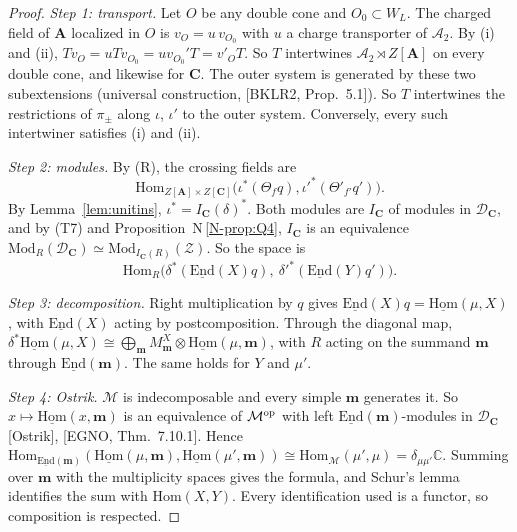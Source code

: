 \documentclass[11pt]{article}
\theoremstyle{definition}
\theoremstyle{remark}
\newcommand{\cA}{\mathcal A}
\newcommand{\bfA}{\mathbf A}
\newcommand{\bfC}{\mathbf C}
\newcommand{\nref}[1]{N\,\ref{N-#1}}
\begin{document}
\begin{proof}
\emph{Step 1: transport.} Let $O$ be any double cone and $O_0\subset W_L$. The charged field of $\bfA$ localized in $O$ is $v_O=u\,v_{O_0}$ with $u$ a charge transporter of $\cA_2$. By (i) and (ii), $Tv_O=uTv_{O_0}=uv_{O_0}'T=v'_OT$. So $T$ intertwines $\cA_2\rtimes Z[\bfA]$ on every double cone, and likewise for $\bfC$. The outer system is generated by these two subextensions (universal construction, [BKLR2, Prop.~5.1]). So $T$ intertwines the restrictions of $\pi_\pm$ along $\iota$, $\iota'$ to the outer system. Conversely, every such intertwiner satisfies (i) and (ii).

\emph{Step 2: modules.} By (R), the crossing fields are
\[
\mathrm{Hom}_{Z[\bfA]\times Z[\bfC]}\big(\iota^*(\Theta_fq),\iota'^*(\Theta'_{f'}q')\big).
\]
By Lemma~\ref{lem:unitins}, $\iota^*=I_{\bfC}(\delta)^*$. Both modules are $I_{\bfC}$ of modules in $\mathcal D_{\bfC}$, and by (T7) and Proposition~\nref{prop:Q4}, $I_{\bfC}$ is an equivalence $\mathrm{Mod}_R(\mathcal D_{\bfC})\simeq\mathrm{Mod}_{I_{\bfC}(R)}(\mathcal Z)$. So the space is
\[
\mathrm{Hom}_R\big(\delta^*(\underline{\mathrm{End}}(X)q),\ \delta'^*(\underline{\mathrm{End}}(Y)q')\big).
\]

\emph{Step 3: decomposition.} Right multiplication by $q$ gives $\underline{\mathrm{End}}(X)q=\underline{\mathrm{Hom}}(\mu,X)$, with $\underline{\mathrm{End}}(X)$ acting by postcomposition. Through the diagonal map, $\delta^*\underline{\mathrm{Hom}}(\mu,X)\cong\bigoplus_{\mathbf m}M^X_{\mathbf m}\otimes\underline{\mathrm{Hom}}(\mu,\mathbf m)$, with $R$ acting on the summand $\mathbf m$ through $\underline{\mathrm{End}}(\mathbf m)$. The same holds for $Y$ and $\mu'$.

\emph{Step 4: Ostrik.} $\mathcal M$ is indecomposable and every simple $\mathbf m$ generates it. So $x\mapsto\underline{\mathrm{Hom}}(x,\mathbf m)$ is an equivalence of $\mathcal M^{\rm op}$ with left $\underline{\mathrm{End}}(\mathbf m)$-modules in $\mathcal D_{\bfC}$ [Ostrik], [EGNO, Thm.~7.10.1]. Hence $\mathrm{Hom}_{\underline{\mathrm{End}}(\mathbf m)}(\underline{\mathrm{Hom}}(\mu,\mathbf m),\underline{\mathrm{Hom}}(\mu',\mathbf m))\cong\mathrm{Hom}_{\mathcal M}(\mu',\mu)=\delta_{\mu\mu'}\mathbb C$. Summing over $\mathbf m$ with the multiplicity spaces gives the formula, and Schur's lemma identifies the sum with $\mathrm{Hom}(X,Y)$. Every identification used is a functor, so composition is respected.
\end{proof}
\end{document}
